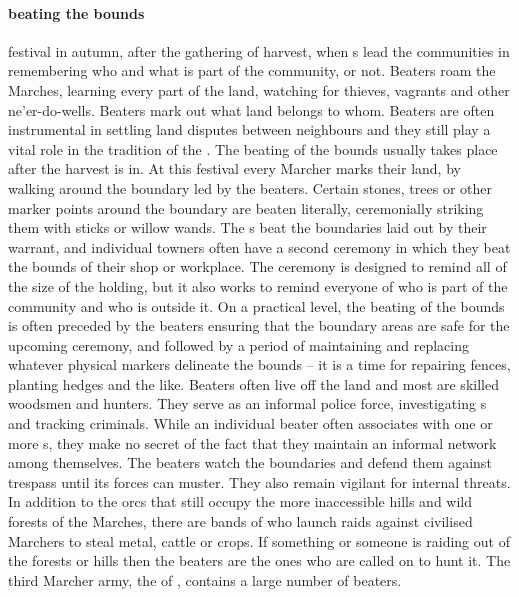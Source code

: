 \paragraph{beating the bounds} festival in autumn, after the gathering of harvest, when s lead the communities in remembering who and what is part of the community, or not. 
 Beaters roam the Marches, learning every part of the land, watching for thieves, vagrants and other ne'er-do-wells. Beaters mark out what land belongs to whom.  Beaters are often instrumental in settling land disputes between neighbours and they still play a vital role in the tradition of the . The beating of the bounds usually takes place after the harvest is in. At this festival every Marcher marks their land, by walking around the boundary led by the beaters. Certain stones, trees or other marker points around the boundary are beaten literally, ceremonially striking them with sticks or willow wands. The s beat the boundaries laid out by their warrant, and individual towners often have a second ceremony in which they beat the bounds of their shop or workplace. The ceremony is designed to remind all of the size of the holding, but it also works to remind everyone of who is part of the community and who is outside it. On a practical level, the beating of the bounds is often preceded by the beaters ensuring that the boundary areas are safe for the upcoming ceremony, and followed by a period of maintaining and replacing whatever physical markers delineate the bounds – it is a time for repairing fences, planting hedges and the like. Beaters often live off the land and most are skilled woodsmen and hunters. They serve as an informal police force, investigating s and tracking criminals. While an individual beater often associates with one or more s, they make no secret of the fact that they maintain an informal network among themselves. The beaters watch the boundaries and defend them against trespass until its forces can muster. They also remain vigilant for internal threats. In addition to the orcs that still occupy the more inaccessible hills and wild forests of the Marches, there are bands of  who launch raids against civilised Marchers to steal metal, cattle or crops. If something or someone is raiding out of the forests or hills then the beaters are the ones who are called on to hunt it. The third Marcher army, the  of , contains a large number of beaters. \bigparagraphendtwiddle
